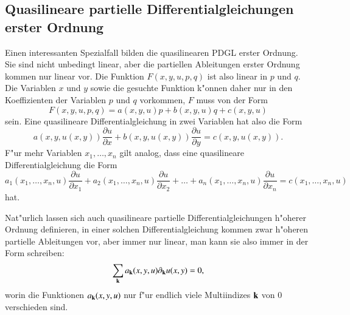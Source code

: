\subsection{Quasilineare partielle Differentialgleichungen erster Ordnung\label{klassifikation:quasilinear}}
Einen interessanten Spezialfall bilden die quasilinearen PDGL erster
Ordnung. Sie sind nicht unbedingt linear, aber die partiellen
Ableitungen erster Ordnung kommen nur linear vor. Die Funktion
$
F(x,y,u,p,q)
$
ist also linear in $p$ und $q$. Die Variablen $x$ und $y$ sowie die
gesuchte Funktion k"onnen daher nur in den Koeffizienten der
Variablen $p$ und $q$ vorkommen, $F$ muss von der Form
\[
F(x,y,u,p,q)=a(x,y,u)p+b(x,y,u)q+c(x,y,u)
\]
sein. Eine quasilineare Differentialgleichung in zwei Variablen
hat also die Form
\[
a(x,y,u(x,y))\frac{\partial u}{\partial x}+b(x,y,u(x,y))\frac{\partial u}{\partial y}
=c(x,y,u(x,y)).
\]
F"ur mehr Variablen $x_1,\dots,x_n$ gilt analog, dass eine quasilineare
Differentialgleichung die Form
\[
a_1(x_1,\dots,x_n,u)\frac{\partial u}{\partial x_1}
+
a_2(x_1,\dots,x_n,u)\frac{\partial u}{\partial x_2}
+\dots
+
a_n(x_1,\dots,x_n,u)\frac{\partial u}{\partial x_n}
=c(x_1,\dots,x_n,u)
\]
hat.

Nat"urlich lassen sich auch quasilineare partielle Differentialgleichungen
h"oherer Ordnung definieren, in einer solchen Differentialgleichung
kommen zwar h"oheren partielle Ableitungen vor, aber immer nur linear,
man kann sie also immer in der Form schreiben:
\[
\sum_{\bf k} a_{\bf k}(x,y,u)\partial_{\bf k} u(x,y) = 0,
\]
worin die Funktionen $a_{\bf k}(x,y,u)$ nur f"ur endlich viele
Multiindizes ${\bf k}$ von $0$ verschieden sind.

